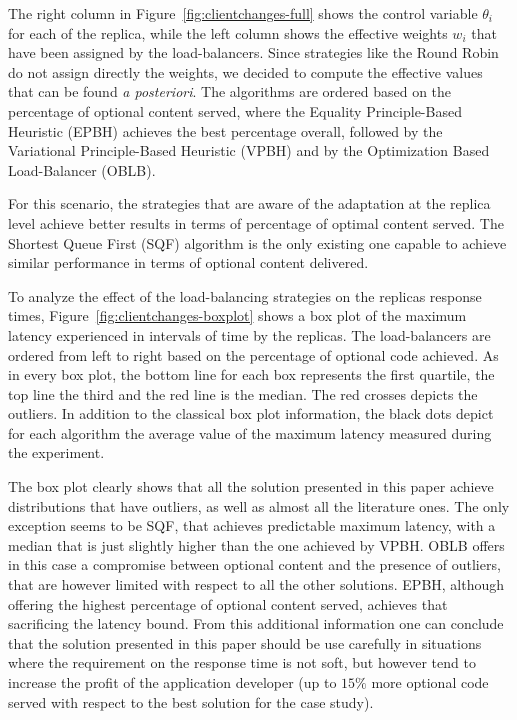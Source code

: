 The right column in Figure~\ref{fig:clientchanges-full} shows the
control variable $\theta_i$ for each of the replica, while the left
column shows the effective weights $w_i$ that have been assigned by
the load-balancers. Since strategies like the Round Robin do not
assign directly the weights, we decided to compute the effective
values that can be found \emph{a posteriori}. The algorithms are
ordered based on the percentage of optional content served, where the
Equality Principle-Based Heuristic (EPBH) achieves the best percentage
overall, followed by the Variational Principle-Based Heuristic (VPBH)
and by the Optimization Based Load-Balancer (OBLB). 

For this scenario, the strategies that are aware of the adaptation at
the replica level achieve better results in terms of percentage of
optimal content served. The Shortest Queue First (SQF) algorithm is
the only existing one capable to achieve similar performance in terms
of optional content delivered.

To analyze the effect of the load-balancing strategies on the replicas
response times, Figure~\ref{fig:clientchanges-boxplot} shows a box
plot of the maximum latency experienced in intervals of time by the
replicas. The load-balancers are ordered from left to right based on
the percentage of optional code achieved. As in every box plot, the
bottom line for each box represents the first quartile, the top line
the third and the red line is the median. The red crosses depicts the
outliers. In addition to the classical box plot information, the black
dots depict for each algorithm the average value of the maximum
latency measured during the experiment.

The box plot clearly shows that all the solution presented in this
paper achieve distributions that have outliers, as well as almost all
the literature ones. The only exception seems to be SQF, that achieves
predictable maximum latency, with a median that is just slightly
higher than the one achieved by VPBH. OBLB offers in this case a
compromise between optional content and the presence of outliers, that
are however limited with respect to all the other solutions. EPBH,
although offering the highest percentage of optional content served,
achieves that sacrificing the latency bound. From this additional
information one can conclude that the solution presented in this paper
should be use carefully in situations where the requirement on the
response time is not soft, but however tend to increase the profit of
the application developer (up to $15\%$ more optional code served with
respect to the best solution for the case study).

